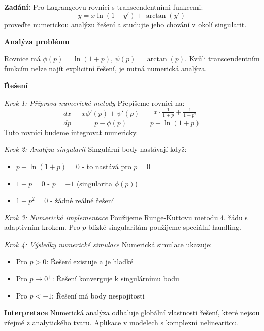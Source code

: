 \begin{example}
\label{ex:numericka-lagrange}

\noindent\textbf{Zadání:} Pro Lagrangeovu rovnici s transcendentními funkcemi:
\[
y = x\ln(1 + y') + \arctan(y')
\]
proveďte numerickou analýzu řešení a studujte jeho chování v okolí singularit.

\vspace{1.5\baselineskip}

\noindent\textbf{Analýza problému}

Rovnice má $\phi(p) = \ln(1 + p)$, $\psi(p) = \arctan(p)$. Kvůli transcendentním funkcím nelze najít explicitní řešení, je nutná numerická analýza.

\vspace{1.5\baselineskip}

\noindent\textbf{Řešení}

\noindent\textit{Krok 1: Příprava numerické metody}
Přepíšeme rovnici na:
\[
\frac{dx}{dp} = \frac{x\phi'(p) + \psi'(p)}{p - \phi(p)} = \frac{x\cdot\frac{1}{1+p} + \frac{1}{1+p^2}}{p - \ln(1+p)}
\]
Tuto rovnici budeme integrovat numericky.

\vspace{1\baselineskip}

\noindent\textit{Krok 2: Analýza singularit}
Singulární body nastávají když:
\begin{itemize}
\item $p - \ln(1+p) = 0$ - to nastává pro $p = 0$
\item $1+p = 0$ - $p = -1$ (singularita $\phi(p)$)
\item $1+p^2 = 0$ - žádné reálné řešení
\end{itemize}

\vspace{1\baselineskip}

\noindent\textit{Krok 3: Numerická implementace}
Použijeme Runge-Kuttovu metodu 4. řádu s adaptivním krokem. Pro $p$ blízké singularitám použijeme speciální handling.

\vspace{1\baselineskip}

\noindent\textit{Krok 4: Výsledky numerické simulace}
Numerická simulace ukazuje:
\begin{itemize}
\item Pro $p > 0$: Řešení existuje a je hladké
\item Pro $p \to 0^+$: Řešení konverguje k singulárnímu bodu
\item Pro $p < -1$: Řešení má body nespojitosti
\end{itemize}

\vspace{1.5\baselineskip}

\noindent\textbf{Interpretace}
Numerická analýza odhaluje globální vlastnosti řešení, které nejsou zřejmé z analytického tvaru. Aplikace v modelech s komplexní nelinearitou.

\end{example}

